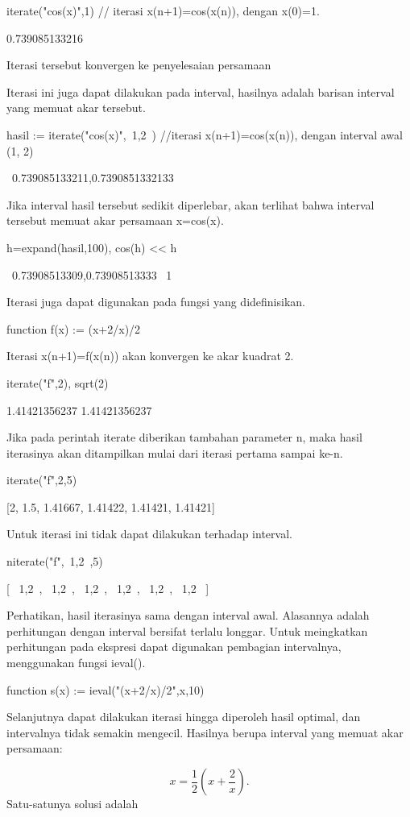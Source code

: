 \documentclass{article}
\begin{document}
\>iterate("cos(x)",1) // iterasi x(n+1)=cos(x(n)), dengan x(0)=1.


    0.739085133216

Iterasi tersebut konvergen ke penyelesaian persamaan


Iterasi ini juga dapat dilakukan pada interval, hasilnya adalah barisan interval yang memuat
akar tersebut.


\>hasil := iterate("cos(x)",~1,2~) //iterasi x(n+1)=cos(x(n)), dengan interval awal (1, 2)


    ~0.739085133211,0.7390851332133~

Jika interval hasil tersebut sedikit diperlebar, akan terlihat bahwa interval tersebut
memuat akar persamaan x=cos(x).


\>h=expand(hasil,100), cos(h) << h


    ~0.73908513309,0.73908513333~
    1

Iterasi juga dapat digunakan pada fungsi yang didefinisikan.


\>function f(x) := (x+2/x)/2


Iterasi x(n+1)=f(x(n)) akan konvergen ke akar kuadrat 2.


\>iterate("f",2), sqrt(2)


    1.41421356237
    1.41421356237

Jika pada perintah iterate diberikan tambahan parameter n, maka hasil iterasinya akan
ditampilkan mulai dari iterasi pertama sampai ke-n.


\>iterate("f",2,5)


    [2,  1.5,  1.41667,  1.41422,  1.41421,  1.41421]

Untuk iterasi ini tidak dapat dilakukan terhadap interval.


\>niterate("f",~1,2~,5)


    [ ~1,2~,  ~1,2~,  ~1,2~,  ~1,2~,  ~1,2~,  ~1,2~ ]

Perhatikan, hasil iterasinya sama dengan interval awal. Alasannya adalah perhitungan dengan
interval bersifat terlalu longgar. Untuk meingkatkan perhitungan pada ekspresi dapat
digunakan pembagian intervalnya, menggunakan fungsi ieval().


\>function s(x) := ieval("(x+2/x)/2",x,10)


Selanjutnya dapat dilakukan iterasi hingga diperoleh hasil optimal,
dan intervalnya tidak semakin mengecil. Hasilnya berupa interval yang
memuat akar persamaan:


$$x = \frac{1}{2} \left( x + \frac{2}{x} \right).$$Satu-satunya solusi adalah
\end{document}
